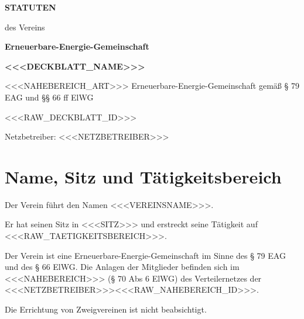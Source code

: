 \documentclass[a4paper,11pt]{article}
\begin{document}
\thispagestyle{deckblatt}
\begin{center}
  \vspace*{3cm}
  {\Huge\bfseries\color{navy}STATUTEN\par}
  \vspace{0.5cm}
  {\Large des Vereins\par}
  \vspace{1cm}
  {\LARGE\bfseries Erneuerbare-Energie-Gemeinschaft\par}
  \vspace{0.3cm}
  {\Large\bfseries <<<DECKBLATT_NAME>>>\par}
  \vspace{2cm}
  {\large <<<NAHEBEREICH_ART>>> Erneuerbare-Energie-Gemeinschaft gemäß § 79 EAG und §§ 66 ff ElWG\par}
  \vspace{0.5cm}
  <<<RAW_DECKBLATT_ID>>>
  \vspace{0.5cm}
  {\large Netzbetreiber: <<<NETZBETREIBER>>>\par}
\end{center}

\newpage
\tableofcontents
\newpage

\section{Name, Sitz und Tätigkeitsbereich}\label{par:name}
\begin{absaetze}
  \item Der Verein führt den Namen \glqq{}<<<VEREINSNAME>>>\grqq{}.
  \item Er hat seinen Sitz in <<<SITZ>>> und erstreckt seine Tätigkeit auf <<<RAW_TAETIGKEITSBEREICH>>>.
  \item Der Verein ist eine Erneuerbare-Energie-Gemeinschaft im Sinne des § 79 EAG und des § 66 ElWG. Die Anlagen
        der Mitglieder befinden sich im <<<NAHEBEREICH>>> (§ 70 Abs 6 ElWG) des Verteilernetzes der <<<NETZBETREIBER>>><<<RAW_NAHEBEREICH_ID>>>.\label{abs:nahebereich}
  \item Die Errichtung von Zweigvereinen ist nicht beabsichtigt.
\end{absaetze}

\end{document}
